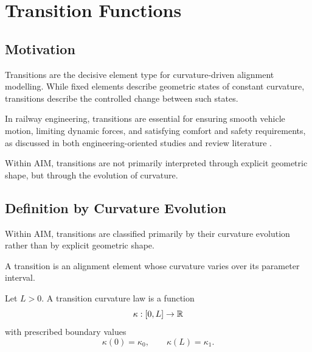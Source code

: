 
\chapter{Transition Functions}

\section*{Motivation}

Transitions are the decisive element type for curvature-driven alignment
modelling. While fixed elements describe geometric states of constant
curvature, transitions describe the controlled change between such
states.

In railway engineering, transitions are essential for ensuring smooth
vehicle motion, limiting dynamic forces, and satisfying comfort and
safety requirements, as discussed in both engineering-oriented studies
and review literature
\cite{Koc2008TransitionCurves,BrustadDalmo2020Review}.

Within AIM, transitions are not primarily interpreted through explicit
geometric shape, but through the evolution of curvature.

\section{Definition by Curvature Evolution}

\begin{principle}
Within AIM, transitions are classified primarily by their curvature
evolution rather than by explicit geometric shape.
\end{principle}

\begin{definition}[Transition]
A transition is an alignment element whose curvature varies over its
parameter interval.
\end{definition}

\begin{definition}
Let $L>0$. A transition curvature law is a function
\[
\kappa : [0,L] \to \mathbb{R}
\]
with prescribed boundary values
\[
\kappa(0)=\kappa_0,
\qquad
\kappa(L)=\kappa_1.
\]
\end{definition}

